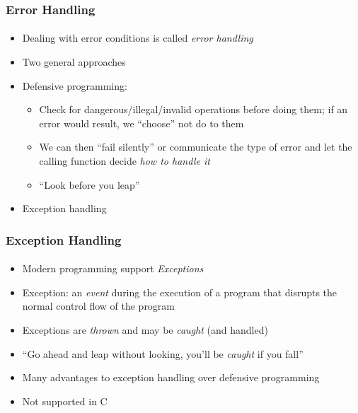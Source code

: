 \documentclass[]{beamer}
\begin{document}
\begin{frame}[fragile]
    \frametitle{Error Handling}
    \framesubtitle{}


\begin{itemize}[<+->]
  \item Dealing with error conditions is called \emph{error handling}
  \item Two general approaches
  \item Defensive programming:
  \begin{itemize}
    \item Check for dangerous/illegal/invalid operations 
      before doing them; if an error would result, we ``choose'' not do to them
    \item We can then ``fail silently'' or communicate the type of error and
    let the calling function decide \emph{how to handle it}
    \item ``Look before you leap''
  \end{itemize}
  \item Exception handling
\end{itemize}

\end{frame}

\begin{frame}[fragile]
    \frametitle{Exception Handling}
    \framesubtitle{}  

\begin{itemize}[<+->]
  \item Modern programming support \emph{Exceptions}
  \item Exception: an \emph{event} during the execution of a program 
    that disrupts the normal control flow of the program
  \item Exceptions are \emph{thrown} and may be \emph{caught} (and handled)
  \item ``Go ahead and leap without looking, you'll be \emph{caught} if you fall''
  \item Many advantages to exception handling over defensive programming
  \item Not supported in C
\end{itemize}    

\end{frame}
\end{document}
